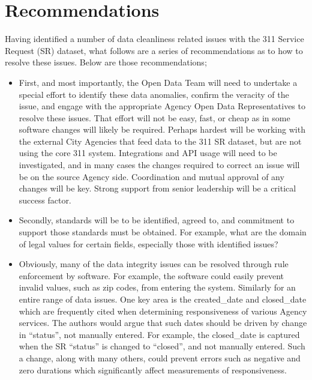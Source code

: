 \documentclass[12pt, titlepage]{article}
\begin{document}
\section{Recommendations} 
\label{sec:recommendations}
Having identified a number of data cleanliness related issues with the 
311 Service Request (SR) dataset, what follows are a series of 
recommendations as to how to resolve these issues. Below are 
those recommendations;

\begin{itemize}
	\item First, and most importantly, the Open Data Team will need 
	to undertake a special effort to identify these data anomalies, confirm 
	the veracity of the issue, and engage with the appropriate Agency 
	Open Data Representatives to resolve these issues. That effort will 
	not be easy, fast, or cheap as in some software changes will likely 
	be required. Perhaps hardest will be working with the external City 
	Agencies that feed data to the 311 SR dataset, but are not using 
	the core 311 system. Integrations and API usage will need to be 
	investigated, and in many cases the changes required to correct 
	an issue will be on the source Agency side. Coordination and 
	mutual approval of any changes will be key. Strong support from 
	senior 	leadership will be a critical success factor.

	\item Secondly, standards will be to be identified, agreed to, and 
	commitment to support those standards must be obtained. For 
	example, what are the domain of legal values for certain fields, 
	especially those with identified issues?

	\item Obviously, many of the data integrity issues can be 
	resolved through rule enforcement by software. For example, the 
	software could easily prevent invalid values, such as zip codes, from 
	entering the system. Similarly for an entire range of data issues. One 
	key area is the created\_date and closed\_date which are frequently 
	cited when determining responsiveness of various Agency services. The 
	authors would argue that such dates should be driven by change 
	in ``status'', not manually entered. For example, the closed\_date 
	is captured when the SR ``status'' is changed to ``closed'', and 
	not manually entered. Such a change, along with many others, could 
	prevent errors such as negative and  zero durations which 
	significantly affect measurements of responsiveness. 
	

\end{itemize}
\end{document}

